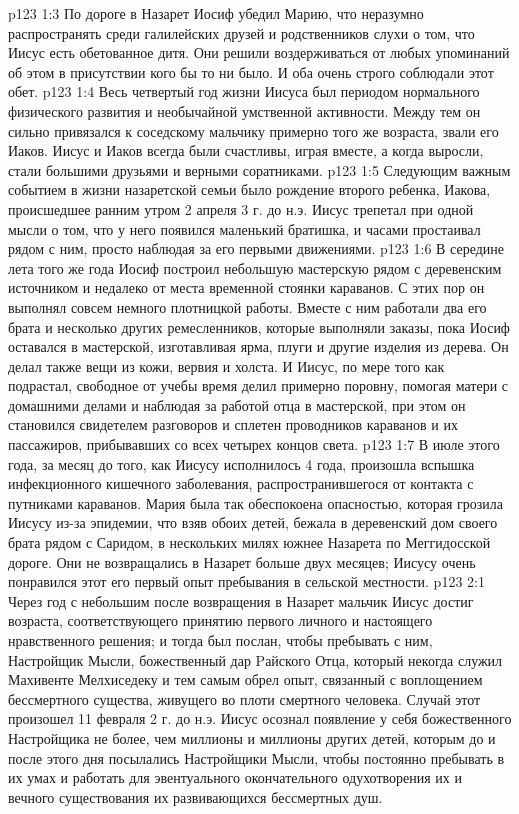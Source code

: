 \vs p123 1:3 По дороге в Назарет Иосиф убедил Марию, что неразумно распространять среди галилейских друзей и родственников слухи о том, что Иисус есть обетованное дитя. Они решили воздерживаться от любых упоминаний об этом в присутствии кого бы то ни было. И оба очень строго соблюдали этот обет.
\vs p123 1:4 Весь четвертый год жизни Иисуса был периодом нормального физического развития и необычайной умственной активности. Между тем он сильно привязался к соседскому мальчику примерно того же возраста, звали его Иаков. Иисус и Иаков всегда были счастливы, играя вместе, а когда выросли, стали большими друзьями и верными соратниками.
\vs p123 1:5 Следующим важным событием в жизни назаретской семьи было рождение второго ребенка, Иакова, происшедшее ранним утром 2 апреля 3 г. до н.э. Иисус трепетал при одной мысли о том, что у него появился маленький братишка, и часами простаивал рядом с ним, просто наблюдая за его первыми движениями.
\vs p123 1:6 В середине лета того же года Иосиф построил небольшую мастерскую рядом с деревенским источником и недалеко от места временной стоянки караванов. С этих пор он выполнял совсем немного плотницкой работы. Вместе с ним работали два его брата и несколько других ремесленников, которые выполняли заказы, пока Иосиф оставался в мастерской, изготавливая ярма, плуги и другие изделия из дерева. Он делал также вещи из кожи, вервия и холста. И Иисус, по мере того как подрастал, свободное от учебы время делил примерно поровну, помогая матери с домашними делами и наблюдая за работой отца в мастерской, при этом он становился свидетелем разговоров и сплетен проводников караванов и их пассажиров, прибывавших со всех четырех концов света.
\vs p123 1:7 В июле этого года, за месяц до того, как Иисусу исполнилось 4 года, произошла вспышка инфекционного кишечного заболевания, распространившегося от контакта с путниками караванов. Мария была так обеспокоена опасностью, которая грозила Иисусу из\hyp{}за эпидемии, что взяв обоих детей, бежала в деревенский дом своего брата рядом с Саридом, в нескольких милях южнее Назарета по Меггидосской дороге. Они не возвращались в Назарет больше двух месяцев; Иисусу очень понравился этот его первый опыт пребывания в сельской местности.
\vs p123 2:1 Через год с небольшим после возвращения в Назарет мальчик Иисус достиг возраста, соответствующего принятию первого личного и настоящего нравственного решения; и тогда был послан, чтобы пребывать с ним, Настройщик Мысли, божественный дар Pайского Отца, который некогда служил Махивенте Мелхиседеку и тем самым обрел опыт, связанный с воплощением бессмертного существа, живущего во плоти смертного человека. Случай этот произошел 11 февраля 2 г. до н.э. Иисус осознал появление у себя божественного Настройщика не более, чем миллионы и миллионы других детей, которым до и после этого дня посылались Настройщики Мысли, чтобы постоянно пребывать в их умах и работать для эвентуального окончательного одухотворения их и вечного существования их развивающихся бессмертных душ.
